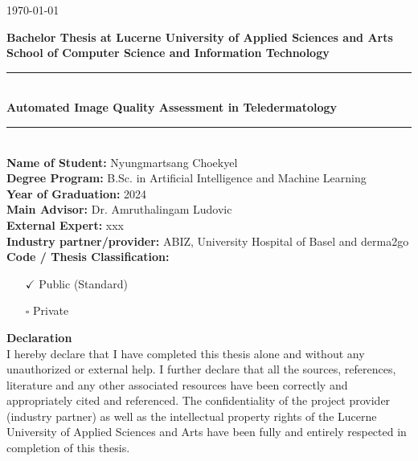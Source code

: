 \begin{titlepage}
	\begin{center}
		\null
		\today
	\end{center}
\end{titlepage}

\newpage


\raggedright

\textbf{\Large Bachelor Thesis at Lucerne University of Applied Sciences and Arts}\\[0.1cm]
\textbf{\Large School of Computer Science and Information Technology}\\[0.5cm]

\rule{\linewidth}{0.5mm}\\[0.4cm]
{\huge \bfseries Automated Image Quality Assessment in Teledermatology}\\[0.2cm]
\rule{\linewidth}{0.5mm}\\[0.5cm]

\textbf{Name of Student:} Nyungmartsang Choekyel\\
\textbf{Degree Program:} B.Sc. in Artificial Intelligence and Machine Learning\\
\textbf{Year of Graduation:} 2024\\[0.8cm]

\textbf{Main Advisor:} Dr. Amruthalingam Ludovic\\
\textbf{External Expert:} xxx\\
\textbf{Industry partner/provider:} ABIZ, University Hospital of Basel and derma2go\\[0.8cm]

\textbf{Code / Thesis Classification:}\\
\begin{itemize}
	\item[$\checkmark$] Public (Standard)
	\item[$\square$] Private
\end{itemize}
\vspace{0.4cm}

\textbf{Declaration}\\[0.5cm]
I hereby declare that I have completed this thesis alone and without any unauthorized or external help. I further declare that all the sources, references, literature and any other associated resources have been correctly and appropriately cited and referenced. The confidentiality of the project provider (industry partner) as well as the intellectual property rights of the Lucerne University of Applied Sciences and Arts have been fully and entirely respected in completion of this thesis.\\[0.8cm]

